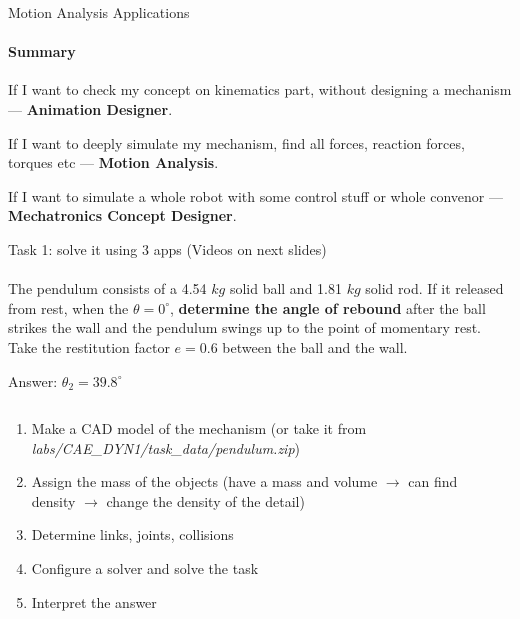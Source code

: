 \documentclass[aspectratio=169]{beamer}
\begin{document}
\begin{frame}[t]{Motion Analysis Applications}
\framesubtitle{Summary}
\Large
\begin{center}
    If I want to check my concept on kinematics part, without designing a mechanism --- \textbf{Animation Designer}. \medskip

    If I want to deeply simulate my mechanism, find all forces, reaction forces, torques etc --- \textbf{Motion Analysis}. \medskip
    
    If I want to simulate a whole robot with some control stuff or whole convenor --- \textbf{Mechatronics Concept Designer}. 
\end{center}
\end{frame}

\begin{frame}[t]{Task 1: solve it using 3 apps (Videos on next slides)}
\framesubtitle{}
\footnotesize
    The pendulum consists of a 4.54 $kg$ solid ball and 1.81 $kg$ solid rod. If it released from rest, when the $\theta = 0^\circ$, \textbf{determine the angle of rebound} after the ball strikes the wall and the pendulum swings up to the point of momentary rest. Take the restitution factor $e=0.6$ between the ball and the wall.
    \smallskip

    \alert{Answer}: $\theta_2 = 39.8^\circ$

    \begin{columns}[T,onlytextwidth]
        \begin{column}{0.49\textwidth}
            \begin{enumerate}
                \footnotesize
                \item Make a CAD model of the mechanism (or take it from \textit{labs/CAE\_DYN1/task\_data/pendulum.zip})
                \item Assign the mass of the objects (have a mass and volume $\rightarrow$ can find density $\rightarrow$ change the density of the detail)
                \item Determine links, joints, collisions
                \item Configure a solver and solve the task
                \item Interpret the answer
            \end{enumerate}
        \end{column}
        \begin{column}{0.49\textwidth}
            \vspace{-1.2cm}


\end{column}
\end{columns}
\end{frame}
\end{document}
